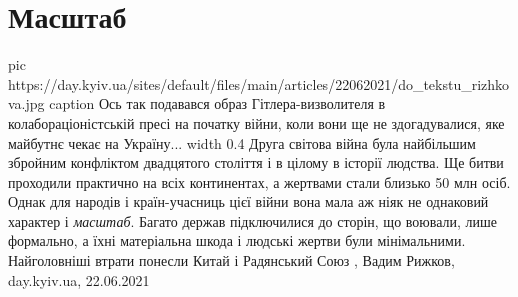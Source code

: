  
 
 
 
 
\chapter{Масштаб}
\label{sec:slova.masshtab}

\ifcmt
  pic https://day.kyiv.ua/sites/default/files/main/articles/22062021/do_tekstu_rizhkova.jpg
	caption Ось так подавався образ Гітлера-визволителя в колабораціоністській пресі на початку війни, коли вони ще не здогадувалися, яке майбутнє чекає на Україну... 
	width 0.4
\fi
Друга світова війна була найбільшим збройним конфліктом двадцятого століття і в
цілому в історії людства. Ще битви проходили практично на всіх континентах, а
жертвами стали близько 50 млн осіб. Однак для народів і країн-учасниць цієї
війни вона мала аж ніяк не однаковий характер і \emph{масштаб}. Багато держав
підключилися до сторін, що воювали, лише формально, а їхні матеріальна шкода і
людські жертви були мінімальними. Найголовніші втрати понесли Китай і
Радянський Союз
, Вадим Рижков, day.kyiv.ua, 22.06.2021
